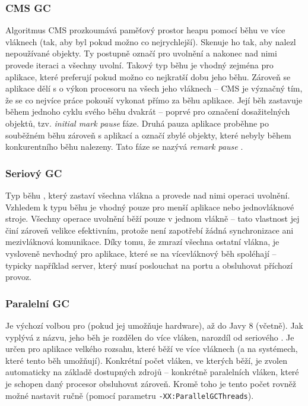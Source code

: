\subsubsection{CMS GC}
Algoritmus CMS  prozkoumává paměťový prostor heapu pomocí běhu ve více vláknech (tak, aby byl pokud možno co nejrychlejší). Skenuje ho tak, aby nalezl nepoužívané objekty. Ty postupně označí pro uvolnění a nakonec nad nimi provede iteraci a všechny uvolní. Takový typ běhu  je vhodný zejména pro aplikace, které preferují pokud možno co nejkratší dobu jeho běhu. Zároveň se aplikace dělí s  o výkon procesoru na všech jeho vláknech -- CMS je význačný tím, že se co nejvíce práce pokouší vykonat přímo za běhu aplikace. Její běh zastavuje během jednoho cyklu svého běhu dvakrát -- poprvé pro označení dosažitelných objektů, tzv. \textit{initial mark pause} fáze. Druhá pauza aplikace proběhne po souběžném běhu zároveň s aplikací a označí zbylé objekty, které nebyly během konkurentního běhu nalezeny. Tato fáze se nazývá \textit{remark pause} \cite{gc-cms}.

\subsubsection{Seriový GC}
Typ běhu , který zastaví všechna vlákna a provede nad nimi operaci uvolnění. Vzhledem k typu běhu je vhodný pouze pro menší aplikace nebo jednovláknové stroje. Všechny operace uvolnění běží pouze v jednom vlákně -- tato vlastnost jej činí zároveň velikce efektivním, protože není zapotřebí žádná synchronizace ani mezivláknová komunikace. Díky tomu, že zmrazí všechna ostatní vlákna, je vysloveně nevhodný pro aplikace, které se na vícevláknový běh spoléhají -- typicky například server, který musí poslouchat na portu a obsluhovat příchozí provoz.

\subsubsection{Paralelní GC}
Je výchozí volbou pro  (pokud jej umožňuje hardware), až do Javy 8 (včetně). Jak vyplývá z názvu, jeho běh je rozdělen do více vláken, narozdíl od seriového . Je určen pro aplikace velkého rozsahu, které běží ve více vláknech (a na systémech, které tento běh umožňují). Konkrétní počet vláken, ve kterých  běží, je zvolen automaticky na základě dostupných zdrojů -- konkrétně paralelních vláken, které je schopen daný procesor obsluhovat zároveň. Kromě toho je tento počet rovněž možné nastavit ručně (pomocí parametru \texttt{-XX:ParallelGCThreads}). 

